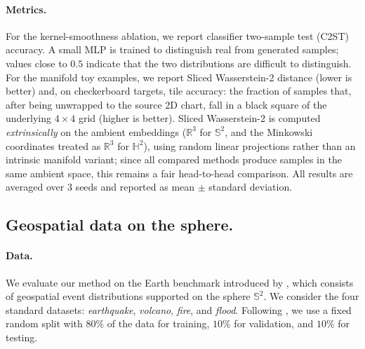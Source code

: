 \documentclass{article}
\theoremstyle{plain}
\begin{document}
\paragraph{Metrics.}
For the kernel-smoothness ablation, we report classifier two-sample test (C2ST) accuracy. A small MLP is trained to distinguish real from generated samples; values close to $0.5$ indicate that the two distributions are difficult to distinguish. For the manifold toy examples, we report Sliced Wasserstein-2 distance (lower is better) and, on checkerboard targets, tile accuracy: the fraction of samples that, after being unwrapped to the source 2D chart, fall in a black square of the underlying $4{\times}4$ grid (higher is better). Sliced Wasserstein-2 is computed \emph{extrinsically} on the ambient embeddings ($\mathbb{R}^3$ for $\mathbb{S}^2$, and the Minkowski coordinates treated as $\mathbb{R}^3$ for $\mathbb{H}^2$), using random linear projections rather than an intrinsic manifold variant; since all compared methods produce samples in the same ambient space, this remains a fair head-to-head comparison. All results are averaged over $3$ seeds and reported as mean $\pm$ standard deviation.

\subsection{Geospatial data on the sphere.}

\paragraph{Data.}
We evaluate our method on the Earth benchmark introduced by \citet{Mathieu_2020_Earth}, which consists of geospatial event distributions supported on the sphere $\mathbb{S}^2$. We consider the four standard datasets: \textit{earthquake}, \textit{volcano}, \textit{fire}, and \textit{flood}. Following \citet{Woo_2026_RMeanFlow}, we use a fixed random split with $80\%$ of the data for training, $10\%$ for validation, and $10\%$ for testing.

\end{document}
